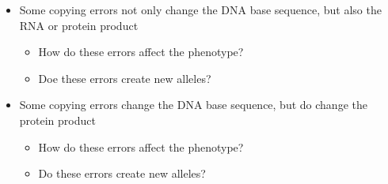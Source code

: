 \begin{frame}[t]
    \begin{adjustwidth}{-1.5em}{-1.5em}
        \begin{itemize}
            \item Some copying errors not only change the DNA base sequence,
                but also the RNA or protein product

                \begin{itemize}
                    \item How do these errors affect the phenotype?


                    \vspace{2mm}
                    \item Doe these errors create new alleles?

                \end{itemize}

            \vspace{2mm}
            \item Some copying errors change the DNA base sequence, but do
                 change the protein product

                \begin{itemize}
                    \item How do these errors affect the phenotype?


                    \vspace{2mm}
                    \item Do these errors create new alleles?

                \end{itemize}

        \end{itemize}
    \end{adjustwidth}
\end{frame}

